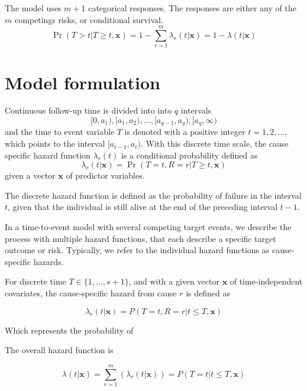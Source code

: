 The model uses $m + 1$ categorical responses.
The responses are either any of the $m$ competings risks, 
or conditional survival.
%
\begin{equation}
    \Pr(T > t | T \geq t, \mathbf{x})
    = 1 - \sum_{r = 1}^{m} \lambda_r (t | \mathbf{x})
    = 1 - \lambda (t | \mathbf{x})
\end{equation}

\section{Model formulation}

Continuous follow-up time is divided into into $q$ intervals
%
\begin{equation*}
	[0, a_1), [a_1, a_2), ..., [a_{q-1}, a_q), [a_{q}, \infty)
\end{equation*}
%
and the time to event variable \(T\) is denoted 
with a positive integer \(t = 1, 2, ...\),
which points to the interval \([a_{t-1}, a_{t})\).
With this discrete time scale,
the cause specific hazard function \(\lambda_{r}(t)\) is a conditional probability defined as
%
\begin{equation*}
    \lambda_{r}(t | \mathbf{x}) = \Pr (T = t, R = r | T \geq t, \mathbf{x})
\end{equation*}
%
given a vector \(\mathbf{x}\) of predictor variables.

The discrete hazard function is defined as
the probability of failure in the interval \(t\),
given that the individual is still alive at the end of the preceding interval
\(t - 1\).

In a time-to-event model with several competing target events,
we describe the process with multiple hazard functions, 
that each describe a specific target outcome or risk.
Typically, 
we refer to the individual hazard functions as cause-specific hazards.

For discrete time \(T \in \{1, ..., s+1\}\), and with a given vector \(\mathbf{x}\) of time-independent covariates,
the cause-specific hazard from cause \(r\) is defined as

\begin{equation}
    \lambda_{r}(t|\mathbf{x}) 
    = P(T = t, R = r | t \leq T, \mathbf{x})
\end{equation}

Which represents the probability of 

The overall hazard function is

\begin{equation}
    \lambda(t|\mathbf{x}) 
    = \sum_{r=1}^{m}(\lambda_{r}(t|\mathbf{x}))
    = P(T = t | t \leq T, \mathbf{x})
\end{equation}

